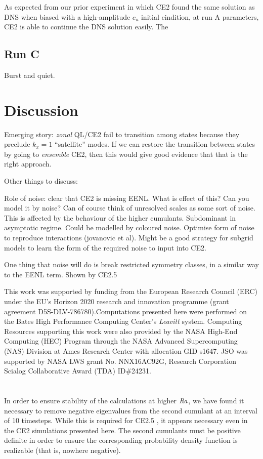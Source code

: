 \documentclass{jfm}
\newcommand{\cu}{c_u}
\newcommand{\Rayleigh}{\mbox{\textit{Ra}}}  %
\begin{document}
As expected from our prior experiment in which CE2 found the same solution as DNS when biased with a high-amplitude $\cu$ initial cindition, at run A parameters, CE2 is able to continue the DNS solution easily.
The 

\subsection{Run C}
\label{sec:run_c_dns_ce2}

Burst and quiet.

\section{Discussion}
\label{sec:discussion}

Emerging story: \emph{zonal} QL/CE2 fail to transition among states because they preclude $k_x = 1$ ``satellite'' modes. If we can restore the transition between states by going to \emph{ensemble} CE2, then this would give good evidence that that is the right approach.

Other things to discuss:

Role of noise: clear that CE2 is missing EENL. What is effect of this? Can you model it by noise? Can of course think of unresolved scales as some sort of noise. This is affected by the behaviour of the higher cumulants. Subdominant in asymptotic regime. Could be modelled by coloured noise. Optimise form of noise to reproduce interactions (jovanovic et al). Might be a good strategy for subgrid models to learn the form of the required noise to input into CE2.

One thing that noise will do is break restricted symmetry classes, in a similar way to the EENL term. Shown by CE2.5



This work was supported by funding from the European Research Council (ERC) under the EU’s Horizon 2020 research and innovation programme (grant agreement D5S-DLV-786780).Computations presented here were performed on the Bates High Performance Computing Center's \emph{Leavitt} system. Computing Resources supporting this work were also provided by the NASA High-End Computing (HEC) Program through the NASA Advanced Supercomputing (NAS) Division at Ames Research Center with allocation GID s1647.
JSO was supported by NASA LWS grant No. NNX16AC92G, Research Corporation Scialog Collaborative Award (TDA) ID\#24231.


\appendix
\section{}\label{appA}
In order to ensure stability of the calculations at higher $\Rayleigh$, we have found it necessary to remove negative eigenvalues from the second cumulant at an interval of 10 timesteps.
While this is required for CE2.5 \citep{marston_qi_tobias_2019}, it appears necessary even in the CE2 simulations presented here.
The second cumulants must be positive definite in order to ensure the corresponding probability density function is realizable (that is, nowhere negative).




\end{document}
